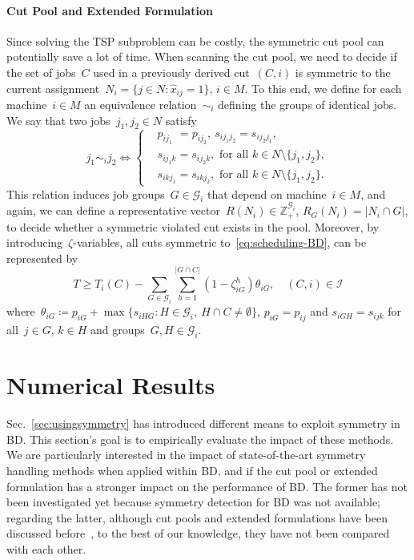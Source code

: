 \documentclass[a4paper,10pt]{article}
\newcommand{\Z}{\mathds{Z}}
\newcommand{\fixed}[1]{\hat{ #1 }}
\newcommand{\define}{\coloneqq}
\theoremstyle{definition}
\begin{document}
\paragraph{Cut Pool and Extended Formulation}
Since solving the TSP subproblem can be costly, the symmetric cut pool can potentially save a lot of time.
When scanning the cut pool, we need to decide if the set of jobs~$C$ used in a previously derived cut~$(C,i)$ is symmetric to the current assignment~$N_i = \{j \in N : \fixed{x}_{ij} = 1\}$, $i \in M$.
To this end, we define for each machine~$i \in M$ an equivalence relation~$\sim_i$ defining the groups of identical jobs.
We say that two jobs~$j_1, j_2 \in N$ satisfy
\begin{equation}
  j_1\sim_{i} j_2 \iff 
  \begin{cases}
    &p_{i j_1\phantom{k}} = p_{i j_2},\ s_{i j_1 j_2} = s_{i j_2 j_1}, \\
    &s_{i j_1 k} = s_{i j_2 k}, \text{ for all } k\in N\setminus\{j_1, j_2\}, \\
    &s_{i k j_1} = s_{i k j_2}, \text{ for all } k\in N\setminus\{j_1, j_2\}.
  \end{cases} \nonumber
\end{equation}
This relation induces job groups~$G\in\mathcal{G}_i$ that depend on machine~$i \in M$, and again, we can define a representative vector~$R(N_i) \in \Z_+^{\mathcal{G}_i}$, $R_G(N_i) = |N_i \cap G|$, to decide whether a symmetric violated cut exists in the pool.
Moreover, by introducing~$\zeta$-variables, all cuts symmetric to~\eqref{eq:scheduling-BD}, can be represented by
\begin{equation}
  T \geq T_i(C) - \sum_{G\in \mathcal{G}_i} \sum_{h = 1}^{|G\cap C|} (1 - \zeta^h_{iG})\theta_{iG}, \quad (C, i)\in \mathcal{I}\label{eq:EF-scheduling-cut}
\end{equation}
where~$\theta_{iG} \define p_{iG} + \max\{s_{i H G} : H \in \mathcal{G}_i,\ H \cap C \neq \emptyset\}$,
$p_{iG} = p_{ij}$ and $s_{iGH} = s_{ijk}$ for all~$j\in G$, $k\in H$ and groups~$G,H \in \mathcal{G}_i$.

%
%

\section{Numerical Results}
\label{sec:numerics}

Sec.~\ref{sec:usingsymmetry} has introduced different means to exploit symmetry in BD.
This section's goal is to empirically evaluate the impact of these methods.
We are particularly interested in the impact of state-of-the-art symmetry handling methods when applied within BD, and if the cut pool or extended formulation has a stronger impact on the performance of BD.
The former has not been investigated yet because symmetry detection for BD was not available;
regarding the latter, although cut pools and extended formulations have been discussed before~\cite{Daryalal2023,Han2025,riise2016recursive}, to the best of our knowledge, they have not been compared with each other.
\end{document}
